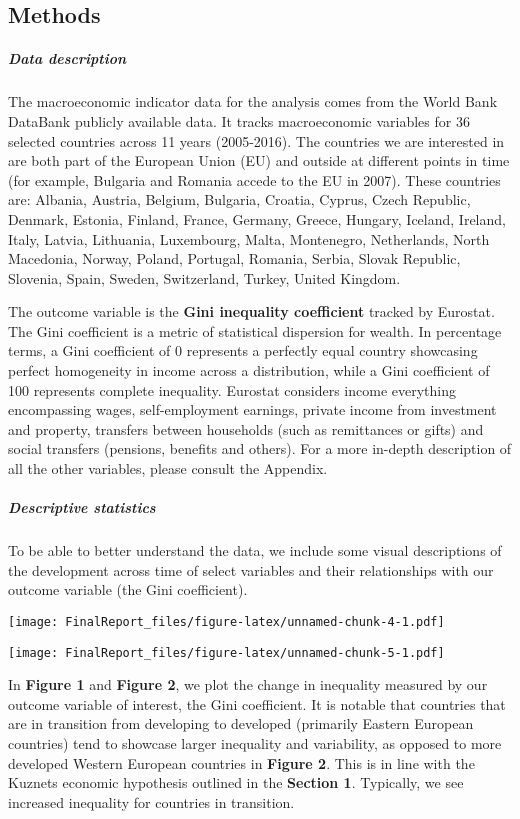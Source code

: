 \documentclass[
]{article}
\begin{document}
\hypertarget{methods}{%
\subsection{Methods}\label{methods}}

\hypertarget{data-description}{%
\subparagraph{Data description}\label{data-description}}

The macroeconomic indicator data for the analysis comes from the World
Bank DataBank publicly available data. It tracks macroeconomic variables
for 36 selected countries across 11 years (2005-2016). The countries we
are interested in are both part of the European Union (EU) and outside
at different points in time (for example, Bulgaria and Romania accede to
the EU in 2007). These countries are: Albania, Austria, Belgium,
Bulgaria, Croatia, Cyprus, Czech Republic, Denmark, Estonia, Finland,
France, Germany, Greece, Hungary, Iceland, Ireland, Italy, Latvia,
Lithuania, Luxembourg, Malta, Montenegro, Netherlands, North Macedonia,
Norway, Poland, Portugal, Romania, Serbia, Slovak Republic, Slovenia,
Spain, Sweden, Switzerland, Turkey, United Kingdom.

The outcome variable is the \textbf{Gini inequality coefficient} tracked
by Eurostat. The Gini coefficient is a metric of statistical dispersion
for wealth. In percentage terms, a Gini coefficient of 0 represents a
perfectly equal country showcasing perfect homogeneity in income across
a distribution, while a Gini coefficient of 100 represents complete
inequality. Eurostat considers income everything encompassing wages,
self-employment earnings, private income from investment and property,
transfers between households (such as remittances or gifts) and social
transfers (pensions, benefits and others). For a more in-depth
description of all the other variables, please consult the Appendix.

\hypertarget{descriptive-statistics}{%
\subparagraph{Descriptive statistics}\label{descriptive-statistics}}

To be able to better understand the data, we include some visual
descriptions of the development across time of select variables and
their relationships with our outcome variable (the Gini coefficient).

\texttt{[image: FinalReport\_files/figure-latex/unnamed-chunk-4-1.pdf]}

\texttt{[image: FinalReport\_files/figure-latex/unnamed-chunk-5-1.pdf]}

In \textbf{Figure 1} and \textbf{Figure 2}, we plot the change in
inequality measured by our outcome variable of interest, the Gini
coefficient. It is notable that countries that are in transition from
developing to developed (primarily Eastern European countries) tend to
showcase larger inequality and variability, as opposed to more developed
Western European countries in \textbf{Figure 2}. This is in line with
the Kuznets economic hypothesis outlined in the \textbf{Section 1}.
Typically, we see increased inequality for countries in transition.
\end{document}

